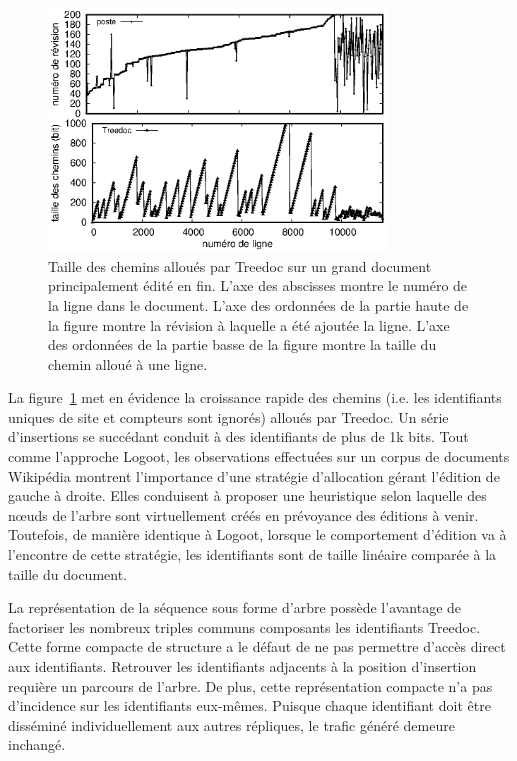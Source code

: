 \begin{figure}
  \begin{center}
    \includegraphics[width=0.8\textwidth]{img/lseq/motivationtreedoc.eps}
    \caption[Taille des chemins alloués par Treedoc sur un grand document édité
    en fin]{\label{repl:img:motivationtreedoc} Taille des chemins alloués par
      Treedoc sur un grand document principalement édité en fin. L'axe des
      abscisses montre le numéro de la ligne dans le document. L'axe des
      ordonnées de la partie haute de la figure montre la révision à laquelle a
      été ajoutée la ligne. L'axe des ordonnées de la partie basse de la figure
      montre la taille du chemin alloué à une ligne.}
  \end{center}
\end{figure}


\noindent La figure~\ref{repl:img:motivationtreedoc} met en évidence la
croissance rapide des chemins (i.e. les identifiants uniques de site et
compteurs sont ignorés) alloués par Treedoc. Un série d'insertions se succédant
conduit à des identifiants de plus de 1k bits. Tout comme l'approche Logoot, les
observations effectuées sur un corpus de documents Wikipédia montrent
l'importance d'une stratégie d'allocation gérant l'édition de gauche à
droite. Elles conduisent à proposer une heuristique selon laquelle des nœuds de
l'arbre sont virtuellement créés en prévoyance des éditions à venir. Toutefois,
de manière identique à Logoot, lorsque le comportement d'édition va à l'encontre
de cette stratégie, les identifiants sont de taille linéaire comparée à la
taille du document.


\noindent La représentation de la séquence sous forme d'arbre possède l'avantage
de factoriser les nombreux triples communs composants les identifiants
Treedoc. Cette forme compacte de structure a le défaut de ne pas permettre
d'accès direct aux identifiants. Retrouver les identifiants adjacents à la
position d'insertion requière un parcours de l'arbre. De plus, cette
représentation compacte n'a pas d'incidence sur les identifiants
eux-mêmes. Puisque chaque identifiant doit être disséminé individuellement aux
autres répliques, le trafic généré demeure inchangé.

